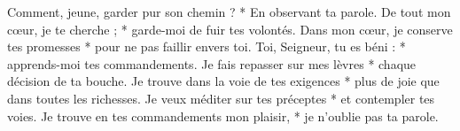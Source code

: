 Comment, jeune, garder pur son chemin ? *
En observant ta parole.
\versseparator
De tout mon cœur, je te cherche ; *
garde-moi de fuir tes volontés.
\versseparator
Dans mon cœur, je conserve tes promesses *
pour ne pas faillir envers toi.
\versseparator
Toi, Seigneur, tu es béni : *
apprends-moi tes commandements.
\versseparator
Je fais repasser sur mes lèvres *
chaque décision de ta bouche.
\versseparator
Je trouve dans la voie de tes exigences *
plus de joie que dans toutes les richesses.
\versseparator
Je veux méditer sur tes préceptes *
et contempler tes voies.
\versseparator
Je trouve en tes commandements mon plaisir, *
je n’oublie pas ta parole.

